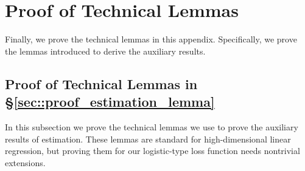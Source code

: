 \documentclass[twoside,11pt]{article}
\begin{document}



\section{Proof of Technical Lemmas}\label{sec::proof_technical}
Finally, we prove the technical lemmas in this appendix. Specifically, we prove the lemmas introduced to derive the auxiliary results.  

\subsection{Proof of Technical Lemmas in \S\ref{sec::proof_estimation_lemma}}
In this subsection we prove the technical lemmas we use to prove the auxiliary results of estimation. These lemmas are standard for high-dimensional  linear regression, but proving them for our logistic-type loss function needs nontrivial extensions.
\end{document}
